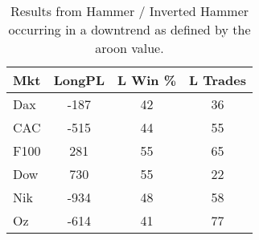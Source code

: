 \begin{table}[ht]
\centering
\caption[Hammer System in downtrend.]{Results from Hammer / Inverted Hammer occurring in a downtrend as defined by the aroon value.} 
\label{tab:hammer_aroon_results}
\begin{tabular}{lccc}
  \toprule Mkt & LongPL & L Win \% & L Trades \\ 
  \midrule Dax & -187 & 42 & 36 \\ 
  CAC & -515 & 44 & 55 \\ 
  F100 & 281 & 55 & 65 \\ 
  Dow & 730 & 55 & 22 \\ 
  Nik & -934 & 48 & 58 \\ 
  Oz & -614 & 41 & 77 \\ 
   \bottomrule \end{tabular}
\end{table}
